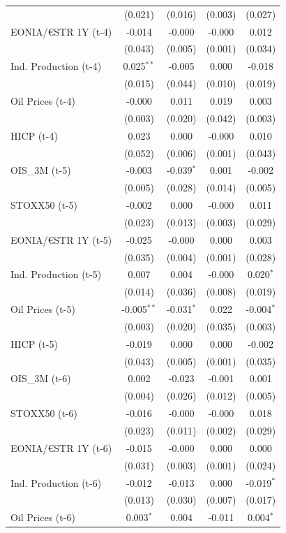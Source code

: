\begin{longtable}[t]{lcccc}
 & (0.021) & (0.016) & (0.003) & (0.027)\\
EONIA/€STR 1Y (t-4) & -0.014 & -0.000 & -0.000 & 0.012\\
 & (0.043) & (0.005) & (0.001) & (0.034)\\
Ind. Production (t-4) & 0.025$^{**}$ & -0.005 & 0.000 & -0.018\\
 & (0.015) & (0.044) & (0.010) & (0.019)\\
Oil Prices (t-4) & -0.000 & 0.011 & 0.019 & 0.003\\
 & (0.003) & (0.020) & (0.042) & (0.003)\\
HICP (t-4) & 0.023 & 0.000 & -0.000 & 0.010\\
 & (0.052) & (0.006) & (0.001) & (0.043)\\
OIS\_3M (t-5) & -0.003 & -0.039$^{*}$ & 0.001 & -0.002\\
 & (0.005) & (0.028) & (0.014) & (0.005)\\
STOXX50 (t-5) & -0.002 & 0.000 & -0.000 & 0.011\\
 & (0.023) & (0.013) & (0.003) & (0.029)\\
EONIA/€STR 1Y (t-5) & -0.025 & -0.000 & 0.000 & 0.003\\
 & (0.035) & (0.004) & (0.001) & (0.028)\\
Ind. Production (t-5) & 0.007 & 0.004 & -0.000 & 0.020$^{*}$\\
 & (0.014) & (0.036) & (0.008) & (0.019)\\
Oil Prices (t-5) & -0.005$^{**}$ & -0.031$^{*}$ & 0.022 & -0.004$^{*}$\\
 & (0.003) & (0.020) & (0.035) & (0.003)\\
HICP (t-5) & -0.019 & 0.000 & 0.000 & -0.002\\
 & (0.043) & (0.005) & (0.001) & (0.035)\\
OIS\_3M (t-6) & 0.002 & -0.023 & -0.001 & 0.001\\
 & (0.004) & (0.026) & (0.012) & (0.005)\\
STOXX50 (t-6) & -0.016 & -0.000 & -0.000 & 0.018\\
 & (0.023) & (0.011) & (0.002) & (0.029)\\
EONIA/€STR 1Y (t-6) & -0.015 & -0.000 & 0.000 & 0.000\\
 & (0.031) & (0.003) & (0.001) & (0.024)\\
Ind. Production (t-6) & -0.012 & -0.013 & 0.000 & -0.019$^{*}$\\
 & (0.013) & (0.030) & (0.007) & (0.017)\\
Oil Prices (t-6) & 0.003$^{*}$ & 0.004 & -0.011 & 0.004$^{*}$\\

\end{longtable}
